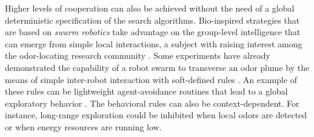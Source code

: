






Higher levels of cooperation can also be achieved without the need of a global deterministic specification of the search algorithms. Bio-inspired strategies that are based on \emph{swarm robotics} take advantage on the group-level intelligence that can emerge from simple local interactions, a subject with raising interest among the odor-locating research community \cite{Torney2009}.
Some experiments have already demonstrated the capability of a robot swarm to transverse an odor plume by the means of simple inter-robot interaction with soft-defined rules \cite{Marjovi2013}.
An example of these rules can be lightweight agent-avoidance routines that lead to a global exploratory behavior \cite{Marques2006}.
The behavioral rules can also be context-dependent. For instance, long-range exploration could be inhibited when local odors are detected or when energy resources are running low.




\vspace{-0.5cm}
